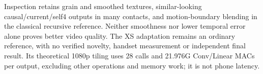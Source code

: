 Inspection retains grain and smoothed textures, similar-looking
causal/current/self4 outputs in many contacts, and motion-boundary
blending in the classical recursive reference. Neither smoothness nor
lower temporal error alone proves better video quality. The XS
adaptation remains an ordinary reference, with no verified novelty,
handset measurement or independent final result. Its theoretical
1080p tiling uses 28 calls and 21.976G Conv/Linear MACs per output,
excluding other operations and memory work; it is not phone latency.
